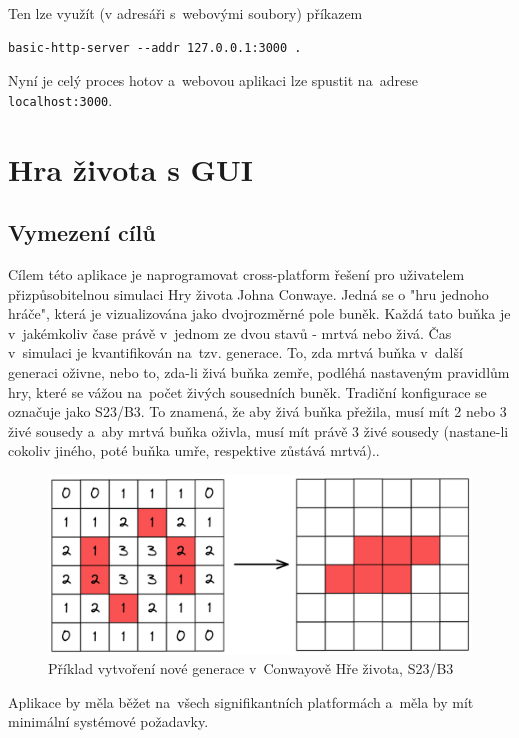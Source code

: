 \documentclass[a4paper, 12pt, twoside]{article} %
\begin{document}
		Ten lze využít (v adresáři s~webovými soubory) příkazem
		\begin{verbatim}
basic-http-server --addr 127.0.0.1:3000 .
		\end{verbatim}
		
		Nyní je celý proces hotov a~webovou aplikaci lze spustit na~adrese \linebreak\texttt{localhost:3000}.\cite{wasm_vid, wasm_gh}


\section{Hra života s GUI}
	\subsection{Vymezení cílů}
		Cílem této aplikace je naprogramovat cross-platform řešení pro uživatelem přizpůsobitelnou simulaci Hry života Johna Conwaye. Jedná se o "hru jednoho hráče", která je vizualizována jako dvojrozměrné pole buněk. Každá tato buňka je v~jakémkoliv čase právě v~jednom ze dvou stavů - mrtvá nebo živá. Čas v~simulaci je kvantifikován na~tzv. generace. To, zda mrtvá buňka v~další generaci oživne, nebo to, zda-li živá buňka zemře, podléhá nastaveným pravidlům hry, které se vážou na~počet živých sousedních buněk. Tradiční konfigurace se označuje jako S23/B3. To znamená, že aby živá buňka přežila, musí mít 2 nebo 3 živé sousedy a~aby mrtvá buňka oživla, musí mít právě 3 živé sousedy (nastane-li cokoliv jiného, poté buňka umře, respektive zůstává mrtvá).\cite{conway}.
		\begin{center}
			\begin{figure}[H]
				\centering
				\includegraphics[width=.82\linewidth]{conway}
				\caption{Příklad vytvoření nové generace v~Conwayově Hře života, S23/B3}
				\label{fig:conway}
			\end{figure}
		\end{center}
	
		Aplikace by měla běžet na~všech signifikantních platformách a~měla by mít minimální systémové požadavky.
	
\end{document}
